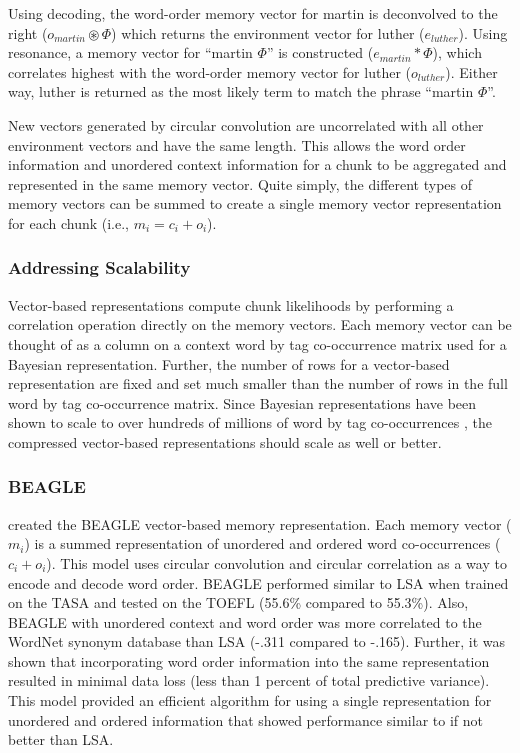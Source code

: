 \documentclass[man,floatsintext,donotrepeattitle]{apa6}
\begin{document}
Using decoding, the word-order memory vector for martin is deconvolved to the right ($o_{martin} \circledast \Phi$) which returns the environment vector for luther ($e_{luther}$).
Using resonance, a memory vector for ``martin $\Phi$'' is constructed ($e_{martin} * \Phi$), which correlates highest with the word-order memory vector for luther ($o_{luther}$).
Either way, luther is returned as the most likely term to match the phrase ``martin $\Phi$''.

New vectors generated by circular convolution are uncorrelated with all other environment vectors and have the same length.
This allows the word order information and unordered context information for a chunk to be aggregated and represented in the same memory vector.
Quite simply, the different types of memory vectors can be summed to create a single memory vector representation for each chunk (i.e., $m_{i} = c_{i} + o_{i}$).

\subsubsection{Addressing Scalability}

Vector-based representations compute chunk likelihoods by performing a correlation operation directly on the memory vectors.
Each memory vector can be thought of as a column on a context word by tag co-occurrence matrix used for a Bayesian representation.
Further, the number of rows for a vector-based representation are fixed and set much smaller than the number of rows in the full word by tag co-occurrence matrix.
Since Bayesian representations have been shown to scale to over hundreds of millions of word by tag co-occurrences \parencite{Stanley2013}, the compressed vector-based representations should scale as well or better.

\subsubsection{BEAGLE}

\textcite{Jones2007} created the BEAGLE vector-based memory representation.
Each memory vector ($m_{i}$) is a summed representation of unordered and ordered word co-occurrences ($c_{i} + o_{i}$).
This model uses circular convolution and circular correlation as a way to encode and decode word order.
BEAGLE performed similar to LSA when trained on the TASA and tested on the TOEFL (55.6\% compared to 55.3\%).
Also, BEAGLE with unordered context and word order was more correlated to the WordNet synonym database than LSA (-.311 compared to -.165).
Further, it was shown that incorporating word order information into the same representation resulted in minimal data loss (less than 1 percent of total predictive variance).
This model provided an efficient algorithm for using a single representation for unordered and ordered information that showed performance similar to if not better than LSA.
\end{document}
